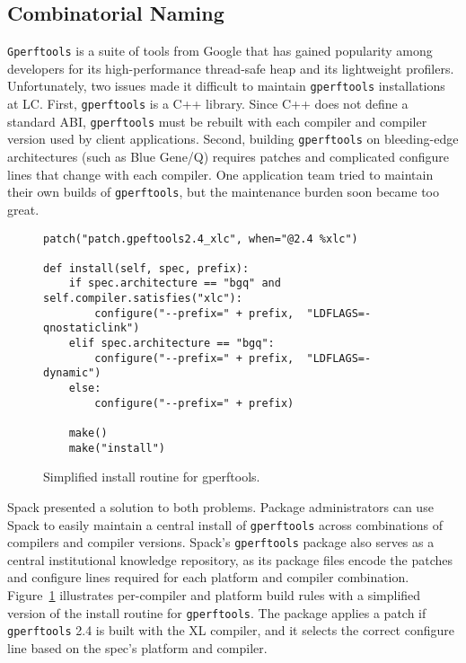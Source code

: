 
\subsection{Combinatorial Naming}
\label{sec:usecase-combinatorial}

{\tt Gperftools} is a suite of tools from Google that has gained popularity among
developers for its high-performance thread-safe heap and its lightweight profilers.
Unfortunately, two issues made it difficult to maintain {\tt gperftools} installations
at LC.  First, {\tt gperftools} is a C++ library.  Since C++ does not define a standard
ABI, {\tt gperftools} must be rebuilt with each compiler and compiler version used by client applications.  Second, building {\tt gperftools} on bleeding-edge architectures
(such as Blue Gene/Q) requires patches and complicated configure lines that
change with each compiler.  One application team tried to maintain their own
builds of {\tt gperftools}, but the maintenance burden soon became too great.

\begin{figure}
\begin{verbatim}
patch("patch.gpeftools2.4_xlc", when="@2.4 %xlc")

def install(self, spec, prefix):
    if spec.architecture == "bgq" and self.compiler.satisfies("xlc"):
        configure("--prefix=" + prefix,  "LDFLAGS=-qnostaticlink")
    elif spec.architecture == "bgq":
        configure("--prefix=" + prefix,  "LDFLAGS=-dynamic")
    else:
        configure("--prefix=" + prefix)

    make()
    make("install")
\end{verbatim}
  \caption{
    Simplified install routine for gperftools.
    \label{fig:gperftools}
  }
\end{figure}

Spack presented a solution to both problems.  Package administrators can use Spack to
easily maintain a central install of {\tt gperftools} across combinations of
compilers and compiler versions.  Spack's {\tt gperftools} package also serves as a central
institutional knowledge repository, as its package files encode
the patches and configure lines required for each platform and compiler combination.
%
Figure~\ref{fig:gperftools} illustrates per-compiler and platform build rules with
a simplified version of the install routine for {\tt gperftools}.
The package applies a patch if {\tt gperftools} 2.4 is built with the XL compiler,
and it selects the correct configure line based on the spec's platform and compiler.

